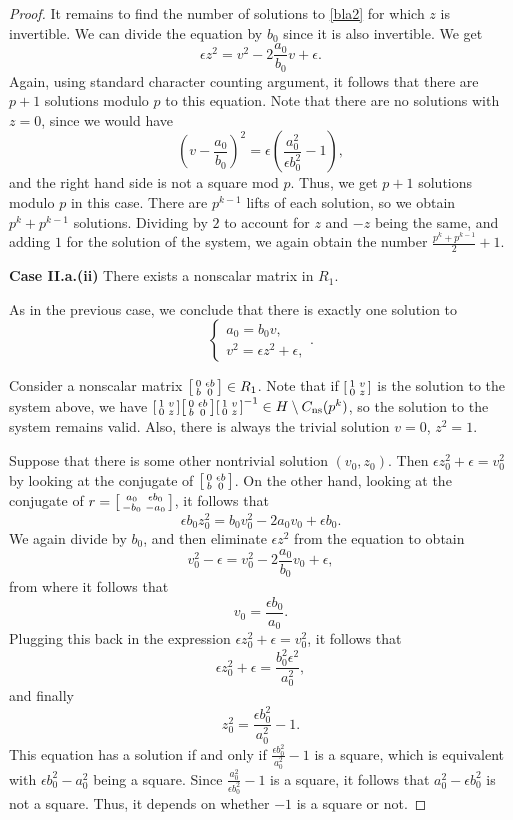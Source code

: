 \documentclass[10pt,leqno]{amsart}
\newcommand\sm[1]{\begin{bsmallmatrix}#1\end{bsmallmatrix}}
\theoremstyle{definition}
\theoremstyle{remark}
\numberwithin{theorem}{section}
\begin{document}
\begin{proof}
It remains to find the number of solutions to \eqref{bla2} for which $z$ is invertible. We can divide the equation by $b_0$ since it is also invertible. We get $$\epsilon z^2=v^2-2\frac{a_0}{b_0}v+\epsilon.$$
Again, using standard character counting argument, it follows that there are $p+1$ solutions modulo $p$ to this equation. Note that there are no solutions with $z=0$, since we would have $$\left(v-\frac{a_0}{b_0} \right)^2=\epsilon\left(\frac{a_0^2}{\epsilon b_0^2}-1\right),$$ and the right hand side is not a square mod $p$. Thus, we get $p+1$ solutions modulo $p$ in this case. There are $p^{k-1}$ lifts of each solution, so we obtain $p^k+p^{k-1}$ solutions.  Dividing by $2$ to account for $z$ and $-z$ being the same, and adding $1$ for the solution of the system, we again obtain the number $\frac{p^k+p^{k-1}}{2}+1$.

\noindent \textbf{Case II.a.(ii)} There exists a nonscalar matrix in $R_1$.

As in the previous case, we conclude that there is exactly one solution to $$\begin{cases}
a_0=b_0v, \\
v^2=\epsilon z^2+\epsilon,
\end{cases}.$$

Consider a nonscalar matrix $\sm{0 & \epsilon b \\ b & 0} \in R_1$. Note that if $\sm{1 & v \\0 & z}$ is the solution to the system above, we have $\sm{1 & v \\0 & z }\sm{0 & \epsilon b \\ b & 0}\sm{1 & v \\ 0 & z}^{-1}\in H\setminus C_{\mathrm{ns}}(p^k)$, so the solution to the system remains valid. Also, there is always the trivial solution $v=0$, $z^2=1$. 

Suppose that there is some other nontrivial solution $(v_0, z_0)$. Then $\epsilon z_0^2+\epsilon= v_0^2$ by looking at the conjugate of $\sm{0 & \epsilon b \\ b & 0 }$. On the other hand, looking at the conjugate of $r=\sm{a_0 & \epsilon b_0 \\ -b_0 & -a_0}$, it follows that $$\epsilon b_0 z_0^2=b_0 v_0^2-2a_0v_0+\epsilon b_0.$$ We again divide by $b_0$, and then eliminate $\epsilon z^2$ from the equation to obtain $$v_0^2-\epsilon=v_0^2-2\frac{a_0}{b_0}v_0+\epsilon,$$ from where it follows that $$v_0=\frac{\epsilon b_0}{a_0}.$$
Plugging this back in the expression $\epsilon z_0^2+\epsilon=v_0^2$, it follows that $$\epsilon z_0^2+\epsilon=\frac{b_0^2\epsilon^2}{a_0^2},$$ and finally $$z_0^2=\frac{\epsilon b_0^2}{a_0^2}-1.$$
This equation has a solution if and only if $\frac{\epsilon b_0^2}{a_0^2}-1$ is a square, which is equivalent with $\epsilon b_0^2-a_0^2$ being a square. Since $\frac{a_0^2}{\epsilon b_0^2}-1$ is a square, it follows that $a_0^2-\epsilon b_0^2$ is not a square. Thus, it depends on whether $-1$ is a square or not. 


\end{proof}
\end{document}
